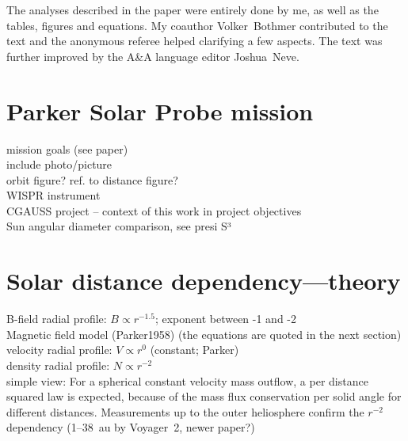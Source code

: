 The analyses described in the paper were entirely done by me, as well as the tables, figures and equations. My coauthor Volker~Bothmer contributed to the text and the anonymous referee helped clarifying a few aspects. The text was further improved by the A\&A language editor Joshua~Neve.\\


\section{Parker Solar Probe mission}

mission goals (see paper)\\
include photo/picture\\
orbit figure? ref. to distance figure?\\
WISPR instrument\\
CGAUSS project -- context of this work in project objectives\\
Sun angular diameter comparison, see presi S³\\


\section{Solar distance dependency---theory}
B-field radial profile: $B \propto r^{-1.5}$; exponent between -1 and -2\\
	Magnetic field model (Parker1958) (the equations are quoted in the next section)\\
velocity radial profile: $V \propto r^{0}$ (constant; Parker)\\
density radial profile: $N \propto r^{-2}$\\
	simple view: For a spherical constant velocity mass outflow, a per distance squared law is expected, because of the mass flux conservation per solid angle for different distances. Measurements up to the outer heliosphere confirm the $r^{-2}$ dependency (1--38~au by Voyager~2, \citep{Belcher1993} newer paper?)\\

